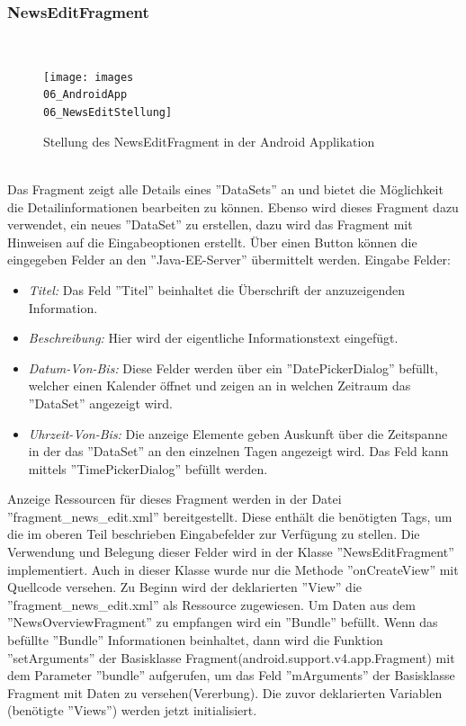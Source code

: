 \subsubsection{NewsEditFragment}
\\
\begin{figure}[H]
\centering
\texttt{[image: images\\06\_AndroidApp\\06\_NewsEditStellung]}
\caption{Stellung des NewsEditFragment in der Android Applikation}
\label{fig:mediaNav}
\end{figure}
\\
Das Fragment zeigt alle Details eines ''DataSets'' an und bietet die Möglichkeit die Detailinformationen bearbeiten zu können. Ebenso wird dieses Fragment dazu verwendet, ein neues ''DataSet'' zu erstellen, dazu wird das Fragment mit Hinweisen auf die Eingabeoptionen erstellt. Über einen Button können die eingegeben Felder an den ''Java-EE-Server'' übermittelt werden. Eingabe Felder:
\begin{itemize}
	\item {\em Titel:} Das Feld ''Titel'' beinhaltet die Überschrift der anzuzeigenden Information.
	\item {\em Beschreibung:} Hier wird der eigentliche Informationstext eingefügt.
	\item{\em Datum-Von-Bis:} Diese Felder werden über ein ''DatePickerDialog'' befüllt, welcher einen Kalender öffnet und zeigen an in welchen Zeitraum das ''DataSet'' angezeigt wird. 
	\item {\em Uhrzeit-Von-Bis:} Die anzeige Elemente geben Auskunft über die Zeitspanne in der das ''DataSet'' an den einzelnen Tagen angezeigt wird. Das Feld kann mittels ''TimePickerDialog'' befüllt werden.		
\end{itemize}
Anzeige Ressourcen für dieses Fragment werden in der Datei ''fragment\_news\_edit.xml'' bereitgestellt. Diese enthält die benötigten Tags, um die im oberen Teil beschrieben Eingabefelder zur Verfügung zu stellen. Die Verwendung und Belegung dieser Felder wird in der Klasse ''NewsEditFragment'' implementiert. Auch in dieser Klasse wurde nur die Methode ''onCreateView'' mit Quellcode versehen. Zu Beginn wird der deklarierten ''View'' die ''fragment\_news\_edit.xml'' als Ressource zugewiesen. Um Daten aus dem ''NewsOverviewFragment'' zu empfangen wird ein ''Bundle'' befüllt. Wenn das befüllte ''Bundle'' Informationen beinhaltet, dann wird die Funktion ''setArguments'' der Basisklasse Fragment(android.support.v4.app.Fragment) mit dem Parameter ''bundle'' aufgerufen, um das Feld ''mArguments'' der Basisklasse Fragment mit Daten zu versehen(Vererbung). Die zuvor deklarierten Variablen (benötigte ''Views'') werden jetzt initialisiert.
